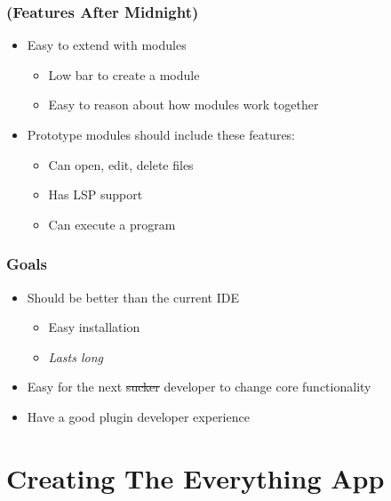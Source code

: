 \documentclass{beamer}
\begin{document}
\begin{frame}
  \frametitle{(Features After Midnight)}
  \begin{itemize}
    \item Easy to extend with modules
      \begin{itemize}
        \item Low bar to create a module
        \item Easy to reason about how modules work together
      \end{itemize}
    \item Prototype modules should include these features:
      \begin{itemize}
        \item Can open, edit, delete files
        \item Has LSP support
        \item Can execute a program
      \end{itemize}
  \end{itemize}
\end{frame}

\begin{frame}
  \frametitle{Goals}
  \begin{itemize}
    \item Should be better than the current IDE
      \begin{itemize}
        \item Easy installation
        \item \textit{Lasts long} %
      \end{itemize}
    \item Easy for the next \sout{sucker} developer to change core functionality
    \item Have a good plugin developer experience
  \end{itemize}
\end{frame}

\section{Creating The Everything App}
\SectionPage
\end{document}
